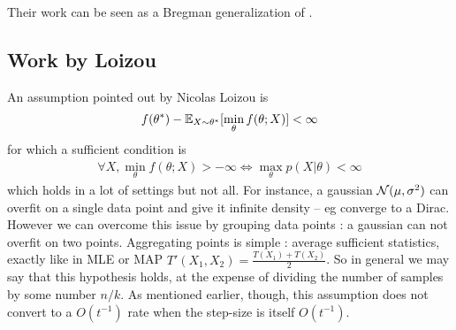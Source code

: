 \documentclass{article}
\newcommand{\natp}{\theta}
\begin{document}
Their work can be seen as a Bregman generalization of \citet{gower2019sgd}.

\subsection{Work by Loizou}
An assumption pointed out by Nicolas Loizou is 
\begin{align}
	f(\natp^*) - \E_{X\sim\natp^*}[\min_\natp f(\natp ; X)] < \infty
\end{align}
for which a sufficient condition is 
\begin{align}
\forall X, \min_\natp f(\natp ; X) >	 - \infty \iff \max_\natp p(X|\natp) < \infty
\end{align}
which holds in a lot of settings but not all. For instance, a gaussian ${\mathcal N}(\mu,\sigma^2)$ can overfit on a single data point and give it infinite density -- eg converge to a Dirac. However we can overcome this issue by grouping data points : a gaussian can not overfit on two points. Aggregating points is simple : average sufficient statistics, exactly like in MLE or MAP $T'(X_1,X_2) = \frac{T(X_1) + T(X_2)}{2}$. 
So in general we may say that this hypothesis holds, at the expense of dividing the number of samples by some number $n/k$.
As mentioned earlier, though, this assumption does not convert to a $O(t^{-1})$ rate when the step-size is itself $O(t^{-1})$.
\end{document}

